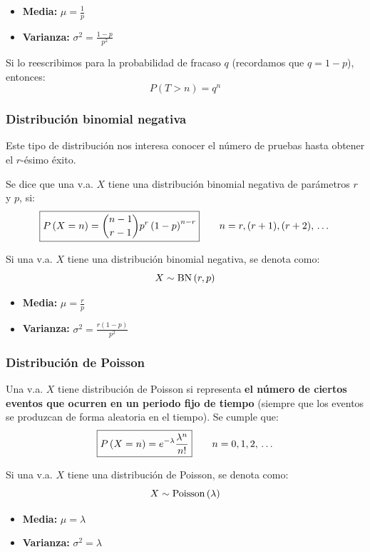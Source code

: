 \documentclass[a4paper]{book}
\begin{document}
\begin{itemize}
	\item \textbf{Media:} $\displaystyle{\mu = \frac{1}{p}}$
	\item \textbf{Varianza:} $\displaystyle{\sigma ^2 = \frac{1-p}{p^2}}$
\end{itemize}

\begin{nota}
	Si lo reescribimos para la probabilidad de fracaso $q$ (recordamos que $q = 1-p$), entonces: \[P\left( T>n \right) = q^n\]
\end{nota}

\subsubsection{Distribución binomial negativa}
Este tipo de distribución nos interesa conocer el número de pruebas hasta obtener el $r$-ésimo éxito.

Se dice que una v.a. $X$ tiene una distribución binomial negativa de parámetros $r$ y $p$, si: \[\boxed{P\left( X=n \right)={\binom{n-1}{r-1}} p^r\left( 1-p \right)^{n-r}} \qquad n= r,(r+1),(r+2),\, \ldots \, \]

Si una v.a. $X$ tiene una distribución binomial negativa, se denota como: \[X \sim \operatorname{BN} \left( r,p \right)\]

\begin{itemize}
	\item \textbf{Media:} $\displaystyle{\mu = \frac{r}{p}}$
	\item \textbf{Varianza:} $\displaystyle{\sigma ^2 = \frac{r(1-p)}{p^2}}$
\end{itemize}

\subsubsection{Distribución de Poisson}
Una v.a. $X$ tiene distribución de Poisson si representa \textbf{el número de ciertos eventos que ocurren en un periodo fijo de tiempo} (siempre que los eventos se produzcan de forma aleatoria en el tiempo). Se cumple que: \[\boxed{P\left( X=n \right)=e^{-\lambda} \frac{\lambda ^n}{n!}} \qquad n= 0,1,2,\, \ldots \, \]

Si una v.a. $X$ tiene una distribución de Poisson, se denota como: \[X \sim \operatorname{Poisson} \left( \lambda \right)\]

\begin{itemize}
	\item \textbf{Media:} $\displaystyle{\mu = \lambda}$
	\item \textbf{Varianza:} $\displaystyle{\sigma ^2 = \lambda}$
\end{itemize}
\end{document}
